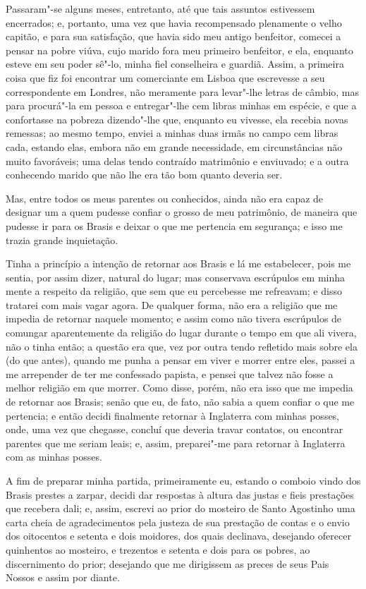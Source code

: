 Passaram"-se alguns meses, entretanto, até que tais assuntos estivessem
encerrados; e, portanto, uma vez que havia recompensado plenamente o
velho capitão, e para sua satisfação, que havia sido meu antigo
benfeitor, comecei a pensar na pobre viúva, cujo marido fora meu
primeiro benfeitor, e ela, enquanto esteve em seu poder sê"-lo, minha
fiel conselheira e guardiã. Assim, a primeira coisa que fiz foi
encontrar um comerciante em Lisboa que escrevesse a seu correspondente
em Londres, não meramente para levar"-lhe letras de câmbio, mas para
procurá"-la em pessoa e entregar"-lhe cem libras minhas em espécie, e que
a confortasse na pobreza dizendo"-lhe que, enquanto eu vivesse, ela
recebia novas remessas; ao mesmo tempo, enviei a minhas duas irmãs no
campo cem libras cada, estando elas, embora não em grande necessidade,
em circunstâncias não muito favoráveis; uma delas tendo contraído
matrimônio e enviuvado; e a outra conhecendo marido que não lhe era tão
bom quanto deveria ser.

Mas, entre todos os meus parentes ou conhecidos, ainda não era capaz de
designar um a quem pudesse confiar o grosso de meu patrimônio, de
maneira que pudesse ir para os Brasis e deixar o que me pertencia em
segurança; e isso me trazia grande inquietação.

Tinha a princípio a intenção de retornar aos Brasis e lá me estabelecer,
pois me sentia, por assim dizer, natural do lugar; mas conservava
escrúpulos em minha mente a respeito da religião, que sem que eu
percebesse me refreavam; e disso tratarei com mais vagar agora. De
qualquer forma, não era a religião que me impedia de retornar naquele
momento; e assim como não tivera escrúpulos de comungar aparentemente da
religião do lugar durante o tempo em que ali vivera, não o tinha então;
a questão era que, vez por outra tendo refletido mais sobre ela (do que
antes), quando me punha a pensar em viver e morrer entre eles, passei a
me arrepender de ter me confessado papista, e pensei que talvez não
fosse a melhor religião em que morrer. Como disse, porém, não era isso
que me impedia de retornar aos Brasis; senão que eu, de fato, não sabia
a quem confiar o que me pertencia; e então decidi finalmente retornar à
Inglaterra com minhas posses, onde, uma vez que chegasse, concluí que
deveria travar contatos, ou encontrar parentes que me seriam leais; e,
assim, preparei"-me para retornar à Inglaterra com as minhas posses.

A fim de preparar minha partida, primeiramente eu, estando o comboio
vindo dos Brasis prestes a zarpar, decidi dar respostas à altura das
justas e fieis prestações que recebera dali; e, assim, escrevi ao prior
do mosteiro de Santo Agostinho uma carta cheia de agradecimentos pela
justeza de sua prestação de contas e o envio dos oitocentos e setenta e
dois moidores, dos quais declinava, desejando oferecer quinhentos ao
mosteiro, e trezentos e setenta e dois para os pobres, ao discernimento
do prior; desejando que me dirigissem as preces de seus Pais Nossos e
assim por diante.

